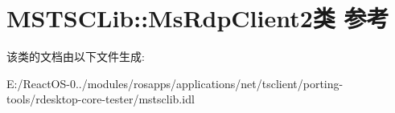 \hypertarget{class_m_s_t_s_c_lib_1_1_ms_rdp_client2}{}\section{M\+S\+T\+S\+C\+Lib\+:\+:Ms\+Rdp\+Client2类 参考}
\label{class_m_s_t_s_c_lib_1_1_ms_rdp_client2}


该类的文档由以下文件生成\+:\begin{DoxyCompactItemize}
\item 
E\+:/\+React\+O\+S-\/0../modules/rosapps/applications/net/tsclient/porting-\/tools/rdesktop-\/core-\/tester/mstsclib.\+idl\end{DoxyCompactItemize}
